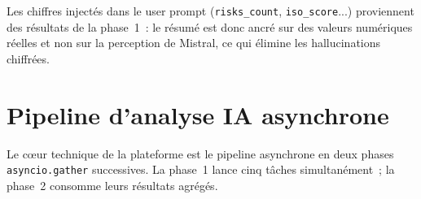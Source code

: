 \documentclass[a4paper,12pt,oneside]{report}
\begin{document}
	Les chiffres inject\'es dans le user prompt (\texttt{risks\_count},
	\texttt{iso\_score}...) proviennent des r\'esultats de la phase~1~:
	le r\'esum\'e est donc ancr\'e sur des valeurs num\'eriques r\'eelles
	et non sur la perception de Mistral, ce qui \'elimine les
	hallucinations chiffr\'ees.
	
	\section{Pipeline d'analyse IA asynchrone}
	
	Le c\oe{}ur technique de la plateforme est le pipeline asynchrone
	en deux phases \texttt{asyncio.gather} successives.
	La phase~1 lance cinq t\^aches simultan\'ement~; la phase~2
	consomme leurs r\'esultats agr\'eg\'es.
	
\end{document}
